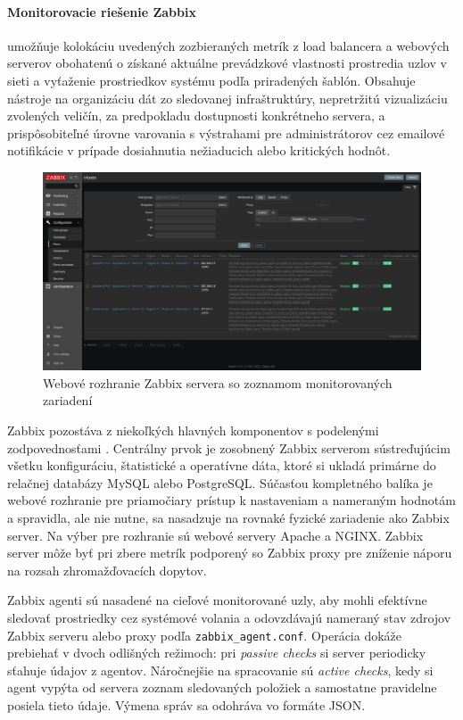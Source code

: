 \documentclass[12pt, a4paper]{article}
\begin{document}
\paragraph{Monitorovacie riešenie Zabbix} umožňuje kolokáciu uvedených zozbieraných metrík z load balancera
a webových serverov obohatenú o získané aktuálne prevádzkové vlastnosti prostredia uzlov v sieti
a vyťaženie prostriedkov systému podľa priradených šablón. Obsahuje nástroje na organizáciu dát zo 
sledovanej infraštruktúry, nepretržitú vizualizáciu zvolených veličín, za predpokladu dostupnosti 
konkrétneho servera, a prispôsobiteľné úrovne varovania s výstrahami pre administrátorov cez emailové 
notifikácie v prípade dosiahnutia nežiaducich alebo kritických hodnôt.
\begin{figure}[h]
	\centering
  	\includegraphics[width=\textwidth]{images/zabbix-host-config.png}
  	\caption{Webové rozhranie Zabbix servera so zoznamom monitorovaných zariadení}
\end{figure}

Zabbix pozostáva z niekoľkých hlavných komponentov s podelenými zodpovednosťami \cite{zabbix-monitoring}.
Centrálny prvok je zosobnený Zabbix serverom sústreďujúcim všetku konfiguráciu, štatistické a operatívne 
dáta, ktoré si ukladá primárne do relačnej databázy MySQL alebo PostgreSQL. 
Súčasťou kompletného balíka je webové rozhranie pre priamočiary 
prístup k nastaveniam a nameraným hodnotám a spravidla, ale nie nutne, sa nasadzuje na rovnaké fyzické 
zariadenie ako Zabbix server. Na výber pre rozhranie sú webové servery Apache a NGINX. Zabbix server môže 
byť pri zbere metrík podporený so Zabbix proxy pre zníženie náporu na rozsah zhromažďovacích dopytov. 

Zabbix agenti sú nasadené na cieľové monitorované uzly, aby mohli efektívne sledovať prostriedky cez 
systémové volania a odovzdávajú nameraný stav zdrojov Zabbix serveru alebo proxy podľa 
\verb|zabbix_agent.conf|. Operácia dokáže prebiehať v dvoch odlišných režimoch: pri \emph{passive checks}
si server periodicky sťahuje údajov z agentov. Náročnejšie na spracovanie sú \emph{active checks}, kedy
si agent vypýta od servera zoznam sledovaných položiek a samostatne pravidelne posiela tieto údaje. Výmena 
správ sa odohráva vo formáte JSON.
\end{document}
